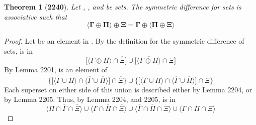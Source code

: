 \documentclass[preview]{standalone}
\newtheorem*{theorem*}{Theorem}
\begin{document}
\begin{theorem*}[\textbf{2240}]
    Let \bm{$\Gamma$}, \bm{$\Pi$}, and \bm{$\Xi$} be sets. 
    The symmetric difference for sets is associative such that 
    \begin{equation*}
        \bm{
            \Big \langle \Gamma \oplus \Pi \Big \rangle
                \oplus 
            \Xi 
                = 
            \Gamma 
                \oplus 
            \Big \langle \Pi \oplus \Xi \Big \rangle
        }
    \end{equation*}
\end{theorem*}
\begin{proof}
    Let \bm{$\zeta$} be an element in 
    \bm{$
        \big \langle \Gamma \oplus \Pi \big \rangle
            \oplus 
        \Xi 
    $}. 
    By the definition for the symmetric 
    difference of sets, \bm{$\zeta$} is in
    \begin{equation*}
        \bigg[
            \Big \langle \Gamma \oplus \Pi \Big \rangle
                \cap
            \overline{\Xi}
        \bigg]
            \cup
        \bigg[
            \Big \langle \overline{
                \Gamma \oplus \Pi
            } \Big \rangle 
                \cap
            \Xi
        \bigg]
    \end{equation*}
    By Lemma 2201, \bm{$\zeta$} is an element of
    \begin{equation*}
        \Bigg\{
            \bigg[
                \Big \langle \Gamma \cup \Pi \Big \rangle
                    \cap
                \Big \langle \overline{\Gamma} \cup \overline{\Pi} \Big \rangle
            \bigg]
                \cap
            \overline{\Xi}
        \Bigg\}
            \cup
        \Bigg\{
            \bigg[ \overline{
                \Big \langle \Gamma \cup \Pi \Big \rangle
                \cap
            \Big \langle \overline{\Gamma} \cup \overline{\Pi} \Big \rangle
            } \bigg]
                \cap
            \Xi
        \Bigg\}
    \end{equation*}
    Each superset on either side of this union is described either by Lemma 2204,
    or by Lemma 2205. Thus, by Lemma 2204, and 2205, \bm{$\zeta$} is in
    \begin{equation*}
        \Big \langle \Pi \cap \overline{\Gamma} \cap \overline{\Xi} \Big \rangle
            \cup
        \Big \langle \Gamma \cap \overline{\Pi} \cap \overline{\Xi} \Big \rangle
            \cup
        \Big \langle \overline{\Gamma} \cap \overline{\Pi} \cap \Xi \Big \rangle
            \cup
        \Big \langle \Gamma \cap \Pi \cap \Xi \Big \rangle

\end{equation*}
\end{proof}
\end{document}
